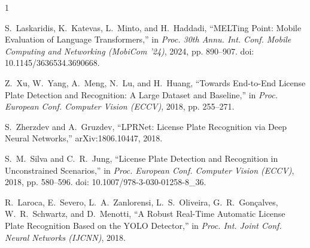 \documentclass[conference]{IEEEtran}
\begin{document}
\begin{thebibliography}{1}

S.~Laskaridis, K.~Katevas, L.~Minto, and H.~Haddadi, ``MELTing Point: Mobile
Evaluation of Language Transformers,'' in \emph{Proc. 30th Annu. Int. Conf.
Mobile Computing and Networking (MobiCom '24)}, 2024, pp. 890--907.
doi: 10.1145/3636534.3690668.

Z.~Xu, W.~Yang, A.~Meng, N.~Lu, and H.~Huang, ``Towards End-to-End License
Plate Detection and Recognition: A Large Dataset and Baseline,'' in
\emph{Proc. European Conf. Computer Vision (ECCV)}, 2018, pp. 255--271.

S.~Zherzdev and A.~Gruzdev, ``LPRNet: License Plate Recognition via Deep Neural
Networks,'' arXiv:1806.10447, 2018.

S.~M.~Silva and C.~R.~Jung, ``License Plate Detection and Recognition in
Unconstrained Scenarios,'' in \emph{Proc. European Conf. Computer Vision
(ECCV)}, 2018, pp. 580--596. doi: 10.1007/978-3-030-01258-8\_36.

R.~Laroca, E.~Severo, L.~A.~Zanlorensi, L.~S.~Oliveira, G.~R.~Gon\c{c}alves,
W.~R.~Schwartz, and D.~Menotti, ``A Robust Real-Time Automatic License Plate
Recognition Based on the YOLO Detector,'' in \emph{Proc. Int. Joint Conf. Neural
Networks (IJCNN)}, 2018.

\end{thebibliography}
\end{document}
